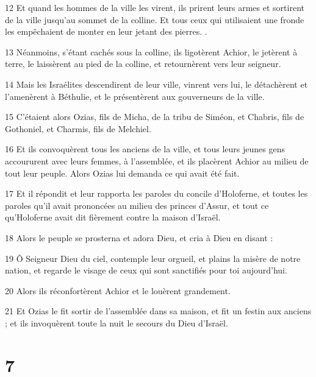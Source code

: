\par 12 Et quand les hommes de la ville les virent, ils prirent leurs armes et sortirent de la ville jusqu'au sommet de la colline. Et tous ceux qui utilisaient une fronde les empêchaient de monter en leur jetant des pierres. .
\par 13 Néanmoins, s'étant cachés sous la colline, ils ligotèrent Achior, le jetèrent à terre, le laissèrent au pied de la colline, et retournèrent vers leur seigneur.
\par 14 Mais les Israélites descendirent de leur ville, vinrent vers lui, le détachèrent et l'amenèrent à Béthulie, et le présentèrent aux gouverneurs de la ville.
\par 15 C'étaient alors Ozias, fils de Micha, de la tribu de Siméon, et Chabris, fils de Gothoniel, et Charmis, fils de Melchiel.
\par 16 Et ils convoquèrent tous les anciens de la ville, et tous leurs jeunes gens accoururent avec leurs femmes, à l'assemblée, et ils placèrent Achior au milieu de tout leur peuple. Alors Ozias lui demanda ce qui avait été fait.
\par 17 Et il répondit et leur rapporta les paroles du concile d'Holoferne, et toutes les paroles qu'il avait prononcées au milieu des princes d'Assur, et tout ce qu'Holoferne avait dit fièrement contre la maison d'Israël.
\par 18 Alors le peuple se prosterna et adora Dieu, et cria à Dieu en disant :
\par 19 Ô Seigneur Dieu du ciel, contemple leur orgueil, et plains la misère de notre nation, et regarde le visage de ceux qui sont sanctifiés pour toi aujourd'hui.
\par 20 Alors ils réconfortèrent Achior et le louèrent grandement.
\par 21 Et Ozias le fit sortir de l'assemblée dans sa maison, et fit un festin aux anciens ; et ils invoquèrent toute la nuit le secours du Dieu d'Israël.

\chapter{7}

